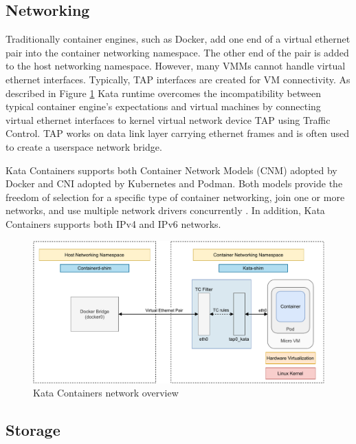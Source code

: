 \subsection{Networking}

Traditionally container engines, such as Docker, add one end of a virtual ethernet pair into the container networking namespace. The other end of the pair is added to the host networking namespace. However, many VMMs cannot handle virtual ethernet interfaces. Typically, TAP interfaces are created for VM connectivity. As described in Figure \ref{fig:KataContainersNetwork} Kata runtime overcomes the incompatibility between typical container engine's expectations and virtual machines by connecting virtual ethernet interfaces to kernel virtual network device TAP using Traffic Control. TAP works on data link layer carrying ethernet frames and is often used to create a userspace network bridge. \cite{KataContainersArchitecture}

Kata Containers supports both Container Network Models (CNM) adopted by Docker and CNI adopted by Kubernetes and Podman. Both models provide the freedom of selection for a specific type of container networking, join one or more networks, and use multiple network drivers concurrently \cite{Randazzo2019}. In addition, Kata Containers supports both IPv4 and IPv6 networks.

\begin{figure}[ht]
  \begin{center}
    \includegraphics[width=13.5cm]{images/KataContainersNetwork.pdf}
    \caption{Kata Containers network overview \cite{KataContainersArchitecture}}
    \label{fig:KataContainersNetwork}
  \end{center}
\end{figure}

\subsection{Storage}

